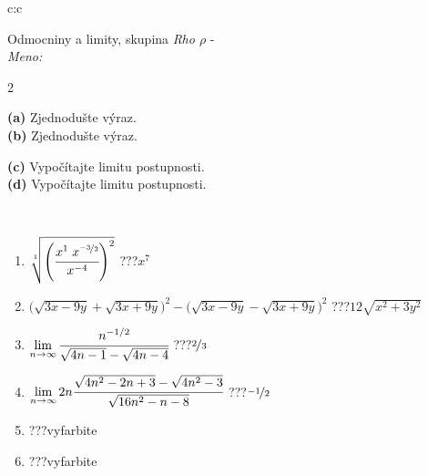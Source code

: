 \documentclass[10pt]{report}
\begin{document}
\begin{tabular}{c:c}
\begin{minipage}[c][104.5mm][t]{0.5\linewidth}
\begin{center}
\vspace{7mm}
{\huge Odmocniny a limity, skupina \textit{Rho $\rho$} -}\\[5mm]
\textit{Meno:}\phantom{xxxxxxxxxxxxxxxxxxxxxxxxxxxxxxxxxxxxxxxxxxxxxxxxxxxxxxxxxxxxxxxxx}\\[5mm]
\begin{minipage}{0.95\linewidth}
\begin{center}
{\small \begin{multicols}{2} \raggedright
\textbf{(a)} Zjednodušte výraz. \\[1mm]
\textbf{(b)} Zjednodušte výraz. \par \columnbreak
\textbf{(c)} Vypočítajte limitu postupnosti. \\[1mm]
\textbf{(d)} Vypočítajte limitu postupnosti.
\end{multicols}
}
\end{center}
\end{minipage}
\\[4mm]
\begin{minipage}{0.79\linewidth}
\begin{center}
\begin{varwidth}{\linewidth}
\begin{enumerate}
\small
\item $\sqrt[1]{\left(\cfrac{x^{1}\;x^{\nicefrac{-3}{2}}}{x^{-4}}\right)^{2}}$\quad \dotfill\; ???\;\dotfill \quad $x^{7}$
\item {\footnotesize{\scriptsize$\big(\sqrt{3x-9y}+\sqrt{3x+9y}\big)^2-\big(\sqrt{3x-9y}-\sqrt{3x+9y}\big)^2$}\quad \dotfill\; ???\;\dotfill \quad $12\sqrt{x^2+3y^2}$}
\item $\lim\limits_{n\to\infty}\cfrac{n^{-1/2}}{\sqrt{4n-1}-\sqrt{4n-4}}$\quad \dotfill\; ???\;\dotfill \quad $\nicefrac{2}{3}$
\item $\lim\limits_{n\to\infty}2n\cfrac{\sqrt{4n^2-2n+3}-\sqrt{4n^2-3}}{\sqrt{16n^2-n-8}}$\quad \dotfill\; ???\;\dotfill \quad $\nicefrac{-1}{2}$
\item \quad \dotfill\; ???\;\dotfill \quad vyfarbite
\item \quad \dotfill\; ???\;\dotfill \quad vyfarbite
\end{enumerate}
\end{varwidth}
\end{center}
\end{minipage}

\end{center}
\end{minipage}
\end{tabular}
\end{document}
